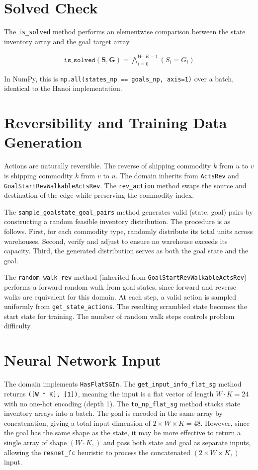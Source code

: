 \documentclass[11pt]{article}
\begin{document}
\section{Solved Check}

The \texttt{is\_solved} method performs an elementwise comparison between the state inventory array and the goal target array.

\begin{align}
    \texttt{is\_solved}(\mathbf{S}, \mathbf{G}) = \bigwedge_{i=0}^{W \cdot K - 1} (S_i = G_i)
\end{align}

In NumPy, this is \texttt{np.all(states\_np == goals\_np, axis=1)} over a batch, identical to the Hanoi implementation.

\section{Reversibility and Training Data Generation}

Actions are naturally reversible. The reverse of shipping commodity $k$ from $u$ to $v$ is shipping commodity $k$ from $v$ to $u$. The domain inherits from \texttt{ActsRev} and \texttt{GoalStartRevWalkableActsRev}. The \texttt{rev\_action} method swaps the source and destination of the edge while preserving the commodity index.

The \texttt{sample\_goalstate\_goal\_pairs} method generates valid (state, goal) pairs by constructing a random feasible inventory distribution. The procedure is as follows. First, for each commodity type, randomly distribute its total units across warehouses. Second, verify and adjust to ensure no warehouse exceeds its capacity. Third, the generated distribution serves as both the goal state and the goal.

The \texttt{random\_walk\_rev} method (inherited from \texttt{GoalStartRevWalkableActsRev}) performs a forward random walk from goal states, since forward and reverse walks are equivalent for this domain. At each step, a valid action is sampled uniformly from \texttt{get\_state\_actions}. The resulting scrambled state becomes the start state for training. The number of random walk steps controls problem difficulty.

\section{Neural Network Input}

The domain implements \texttt{HasFlatSGIn}. The \texttt{get\_input\_info\_flat\_sg} method returns \texttt{([W * K], [1])}, meaning the input is a flat vector of length $W \cdot K = 24$ with no one-hot encoding (depth 1). The \texttt{to\_np\_flat\_sg} method stacks state inventory arrays into a batch. The goal is encoded in the same array by concatenation, giving a total input dimension of $2 \times W \times K = 48$. However, since the goal has the same shape as the state, it may be more effective to return a single array of shape $(W \cdot K,)$ and pass both state and goal as separate inputs, allowing the \texttt{resnet\_fc} heuristic to process the concatenated $(2 \times W \times K,)$ input.
\end{document}
